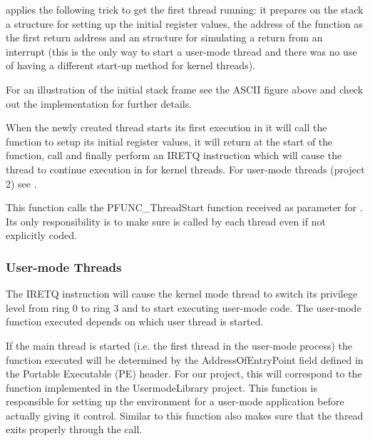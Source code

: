 \begin{appendices}
\projectname applies the following trick to get the first thread running: it prepares on the stack
a  structure for setting up the initial register values, the address of the
 function as the first return address and an  structure
for simulating a return from an interrupt (this is the only way to start a user-mode thread and 
there was no use of having a different start-up method for kernel threads).

For an illustration of the initial stack frame see the ASCII figure above
 and check out the implementation for further details.

When the newly created thread starts its first execution in  it will call the
 function to setup its initial register values, it will return at the start
of the  function, call  and finally perform an
IRETQ instruction which will cause the thread to continue execution in 
for kernel threads. For user-mode threads (project 2) see .

This function calls the PFUNC\_ThreadStart function received as parameter for .
Its only responsibility is to make sure  is called by each thread even if
not explicitly coded.

\subsubsection{User-mode Threads}
\label{sect:UserThreads}

The IRETQ instruction will cause the kernel mode thread to switch its privilege level from ring 0
to ring 3 and to start executing user-mode code. The user-mode function executed depends on which
user thread is started.

If the main thread is started (i.e. the first thread in the user-mode process) the function executed
will be determined by the AddressOfEntryPoint field defined in the Portable Executable (PE) header.
For our project, this will correspond to the  function implemented in the
UsermodeLibrary project. This function is responsible for setting up the environment for a user-mode
application before actually giving it control. Similar to  this
function also makes sure that the thread exits properly through the  call.


\end{appendices}
